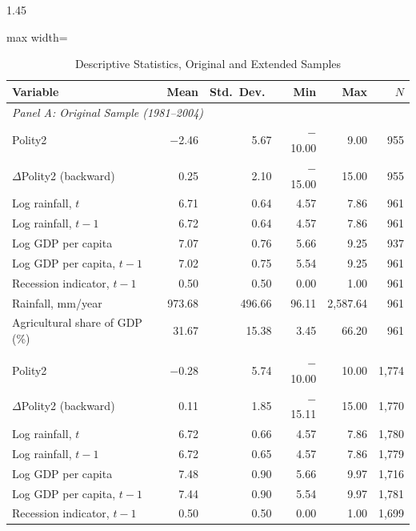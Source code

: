 \documentclass[12pt]{article}
\begin{document}
\begin{bibunit}[jpe]
\begin{spacing}{1.45}
\begin{table}[H]
\centering
\begin{adjustbox}{max width=\textwidth}
\begin{threeparttable}
\caption{Descriptive Statistics, Original and Extended Samples}
\label{tab:C2}
\begin{tabular}{lrrrrr}
\toprule
Variable & Mean & Std.\ Dev.\ & Min & Max & $N$ \\
\midrule
\multicolumn{6}{l}{\textit{Panel A: Original Sample (1981--2004)}} \\
Polity2                        & $-$2.46  & 5.67  & $-$10.00 & 9.00   & 955 \\
$\Delta$Polity2 (backward)     & 0.25    & 2.10  & $-$15.00 & 15.00  & 955 \\
Log rainfall, $t$              & 6.71    & 0.64  & 4.57     & 7.86   & 961 \\
Log rainfall, $t-1$            & 6.72    & 0.64  & 4.57     & 7.86   & 961 \\
Log GDP per capita             & 7.07    & 0.76  & 5.66     & 9.25   & 937 \\
Log GDP per capita, $t-1$      & 7.02    & 0.75  & 5.54     & 9.25   & 961 \\
Recession indicator, $t-1$     & 0.50    & 0.50  & 0.00     & 1.00   & 961 \\
Rainfall, mm/year               & 973.68  & 496.66 & 96.11   & 2{,}587.64 & 961 \\
Agricultural share of GDP (\%) & 31.67   & 15.38 & 3.45     & 66.20  & 961 \\
\addlinespace
\multicolumn{6}{l}{\textit{Panel B: Extended Sample (1981--2024)}} \\
Polity2                        & $-$0.28  & 5.74  & $-$10.00 & 10.00  & 1{,}774 \\
$\Delta$Polity2 (backward)     & 0.11    & 1.85  & $-$15.11 & 15.00  & 1{,}770 \\
Log rainfall, $t$              & 6.72    & 0.66  & 4.57     & 7.86   & 1{,}780 \\
Log rainfall, $t-1$            & 6.72    & 0.65  & 4.57     & 7.86   & 1{,}779 \\
Log GDP per capita             & 7.48    & 0.90  & 5.66     & 9.97   & 1{,}716 \\
Log GDP per capita, $t-1$      & 7.44    & 0.90  & 5.54     & 9.97   & 1{,}781 \\
Recession indicator, $t-1$     & 0.50    & 0.50  & 0.00     & 1.00   & 1{,}699 \\

\end{tabular}
\end{threeparttable}
\end{adjustbox}
\end{table}
\end{spacing}
\end{bibunit}
\end{document}
